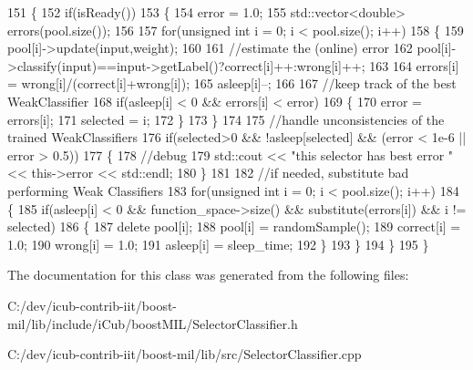 \begin{DoxyCode}
151 \{
152     \textcolor{keywordflow}{if}(isReady())
153     \{
154         error = 1.0;
155         std::vector<double> errors(pool.size());
156 
157         \textcolor{keywordflow}{for}(\textcolor{keywordtype}{unsigned} \textcolor{keywordtype}{int} i = 0; i < pool.size(); i++)
158         \{
159             pool[i]->update(input,weight);
160 
161             \textcolor{comment}{//estimate the (online) error}
162             pool[i]->classify(input)==input->getLabel()?correct[i]++:wrong[i]++;
163 
164             errors[i] = wrong[i]/(correct[i]+wrong[i]);
165             asleep[i]--;
166 
167             \textcolor{comment}{//keep track of the best WeakClassifier}
168             \textcolor{keywordflow}{if}(asleep[i] < 0 && errors[i] < error)
169             \{
170                 error = errors[i];
171                 selected = i;
172             \}
173         \}
174 
175         \textcolor{comment}{//handle unconsistencies of the trained WeakClassifiers}
176         \textcolor{keywordflow}{if}(selected>0 && !asleep[selected] && (error < 1e-6 || error > 0.5))
177         \{
178             \textcolor{comment}{//debug}
179             std::cout << \textcolor{stringliteral}{"this selector has best error "} << this->error << std::endl;
180         \}
181 
182         \textcolor{comment}{//if needed, substitute bad performing Weak Classifiers}
183         \textcolor{keywordflow}{for}(\textcolor{keywordtype}{unsigned} \textcolor{keywordtype}{int} i = 0; i < pool.size(); i++)
184         \{
185             \textcolor{keywordflow}{if}(asleep[i] < 0 && function\_space->size() && substitute(errors[i]) && i != selected)
186             \{
187                 \textcolor{keyword}{delete} pool[i];
188                 pool[i] = randomSample();
189                 correct[i] = 1.0;
190                 wrong[i] = 1.0;
191                 asleep[i] = sleep\_time;
192             \}
193         \}
194     \}
195 \}
\end{DoxyCode}


The documentation for this class was generated from the following files\+:\begin{DoxyCompactItemize}
\item 
C\+:/dev/icub-\/contrib-\/iit/boost-\/mil/lib/include/i\+Cub/boost\+M\+I\+L/Selector\+Classifier.\+h\item 
C\+:/dev/icub-\/contrib-\/iit/boost-\/mil/lib/src/Selector\+Classifier.\+cpp\end{DoxyCompactItemize}
